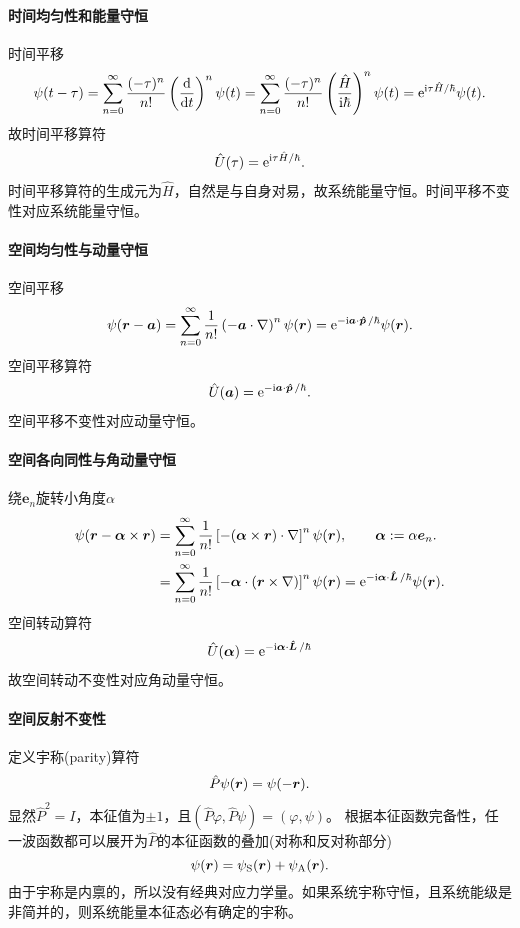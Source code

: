 \paragraph*{时间均匀性和能量守恒}时间平移
\[
	\psi(t-\tau)=\sum_{n=0}^{\infty}\frac{(-\tau)^n}{n!}\left(\frac{\mathrm{d}^{\;\!\!}}{\mathrm{d} t^{\;\!\!}}\right)^n\psi(t)=\sum_{n=0}^{\infty}\frac{(-\tau)^n}{n!}\left(\frac{\hat H}{\mathrm{i}\hbar}\right)^n\psi(t)=\mathop{}\!\mathrm{e}^{\mathrm{i}\tau\hat H/\hbar}\psi(t).
\]
故时间平移算符
\begin{align}
	\hat U(\tau)=\mathop{}\!\mathrm{e}^{\mathrm{i}\tau\hat H/\hbar}.
\end{align}
时间平移算符的生成元为$\hat H$，自然是与自身对易，故系统能量守恒。时间平移不变性对应系统能量守恒。
\paragraph*{空间均匀性与动量守恒}空间平移
\[
	\psi(\bm r-\bm a)=\sum_{n=0}^{\infty}\frac{1}{n!}\left(-\bm a\cdot\nabla\right)^n\psi(\bm r)=\mathop{}\!\mathrm{e}^{-\mathrm{i}\bm a\cdot\bm{\hat p}\!\mathop{}/\hbar}\psi(\bm r).
\]
空间平移算符
\begin{align}
	\hat U(\bm a)=\mathop{}\!\mathrm{e}^{-\mathrm{i}\bm a\cdot\bm{\hat p}\!\mathop{}/\hbar}.
\end{align}
空间平移不变性对应动量守恒。
\paragraph*{空间各向同性与角动量守恒}绕$\bm e_n$旋转小角度$\alpha$
\begin{align*}
	\psi(\bm r-\bm\alpha\times\bm r)&=\sum_{n=0}^{\infty}\frac{1}{n!}\left[-(\bm\alpha\times\bm r)\cdot\nabla\right]^n\psi(\bm r),\qquad\bm\alpha:=\alpha\bm e_n.\\
	&=\sum_{n=0}^{\infty}\frac{1}{n!}\left[-\bm\alpha\cdot(\bm r\times\nabla)\right]^n\psi(\bm r)=\mathop{}\!\mathrm{e}^{-\mathrm{i}\bm\alpha\cdot\bm{\hat L}\!\mathop{}/\hbar}\psi(\bm r).
\end{align*}
空间转动算符
\begin{align}
	\hat U(\bm\alpha)=\mathop{}\!\mathrm{e}^{-\mathrm{i}\bm\alpha\cdot\bm{\hat L}\!\mathop{}/\hbar}
\end{align}
故空间转动不变性对应角动量守恒。
\paragraph*{空间反射不变性}定义宇称(parity)算符
\begin{align}
	\hat P\psi(\bm r)=\psi(-\bm r).
\end{align}
显然$\hat P^2=I$，本征值为$\pm 1$，且$(\hat P\varphi,\hat P\psi)=(\varphi,\psi)$。
根据本征函数完备性，任一波函数都可以展开为$\hat P$的本征函数的叠加(对称和反对称部分)\[
	\psi(\bm r)=\psi_\mathrm S(\bm r)+\psi_\mathrm A(\bm r).
\]
由于宇称是内禀的，所以没有经典对应力学量。如果系统宇称守恒，且系统能级是非简并的，则系统能量本征态必有确定的宇称。


